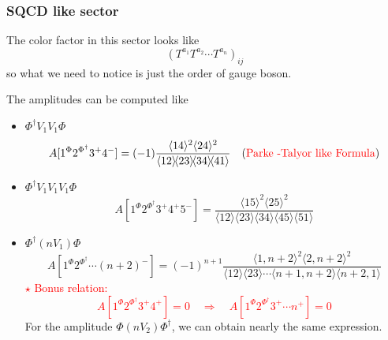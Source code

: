\documentclass{beamer}
\newcommand{\avg}[1]{\langle #1 \rangle}
\newcommand{\mdavg}[2]{\langle #1 \rangle\!\langle #2 \rangle}
\begin{document}
\begin{frame}
    \frametitle{SQCD like sector}
    The color factor in this sector looks like
    \begin{equation*}
        (T^{a_1}T^{a_2}\cdots T^{a_n})_{ij}
    \end{equation*}
    so what we need to notice is just the order of gauge boson.

    The amplitudes can be computed like 
    \begin{itemize}
        \item $\Phi^\dagger V_1V_1\Phi$
        \begin{align*}
            A[1^\Phi2^{\Phi^\dagger}3^+4^-]=(-1)\frac{\avg{14}^2\avg{24}^2}{\mdavg{12}{23}\!\mdavg{34}{41}}\quad (\textcolor{red}{\text{Parke -Talyor like Formula}})
        \end{align*}
        \item $\Phi^\dagger V_1V_1V_1\Phi$
            \begin{equation*}
                A[1^\Phi2^{\Phi^\dagger}3^+4^+5^-]=\frac{\avg{15}^2\!\avg{25}^2}{\mdavg{12}{23}\!\mdavg{34}{45}\!\avg{51}}
            \end{equation*}
    \end{itemize}
\end{frame}

\begin{frame}
    \begin{itemize}
        \item $\Phi^\dagger (nV_1)\Phi$
            \begin{equation*}
                A[1^\Phi2^{\Phi^\dagger}\cdots(n+2)^-]=(-1)^{n+1}\frac{\avg{1,n+2}^2\avg{2,n+2}^2}{\mdavg{12}{23}\cdots\mdavg{n+1,n+2}{n+2,1}}
            \end{equation*}
            \textcolor{red}{$\star$ Bonus relation: \begin{equation*}
                A[1^\Phi2^{\Phi^\dagger}3^+4^+]=0\quad \Rightarrow  \quad A[1^\Phi2^{\Phi^\dagger}3^+\cdots n^+]=0 \end{equation*}}
        For the amplitude $\Phi (nV_2)\Phi^\dagger$, we can obtain nearly the same expression.
    \end{itemize}
\end{frame}
\end{document}
